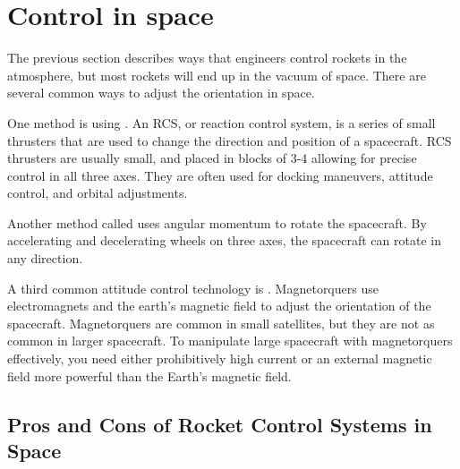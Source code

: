 \section{Control in space}
The previous section describes ways that engineers control rockets in the atmosphere, but most rockets will end up in the vacuum of space. There are several common ways to adjust the orientation in space.

	One method is using . An RCS, or reaction control system, is a series of small thrusters that are used to change the direction and position of a spacecraft.
	RCS thrusters are usually small, and placed in blocks of 3-4 allowing for precise control in all three axes. They are often used for docking maneuvers, attitude control, and orbital adjustments. 

	Another method called  uses angular momentum to rotate the spacecraft. By accelerating and decelerating wheels on three axes, the spacecraft can rotate in any direction.

	A third common attitude control technology is . Magnetorquers use electromagnets and the earth's magnetic field to adjust the orientation of the spacecraft. Magnetorquers
	are common in small satellites, but they are not as common in larger spacecraft. To manipulate large spacecraft with magnetorquers effectively, you need either prohibitively high current or an external magnetic field
	more powerful than the Earth's magnetic field.

	\subsection*{Pros and Cons of Rocket Control Systems in Space}

